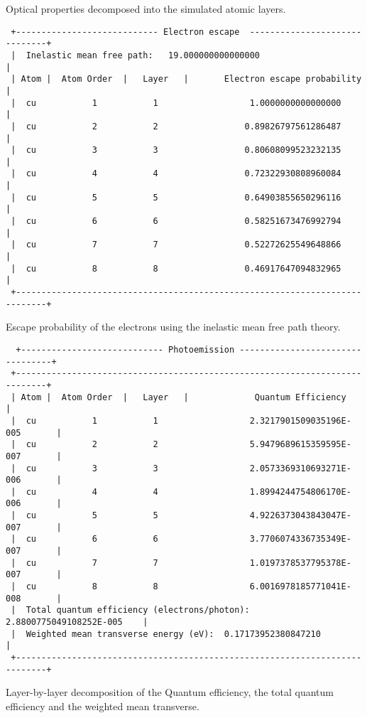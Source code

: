 \documentclass[a4paper,11pt,twoside]{book}
\begin{document}
\begin{enumerate}
Optical properties decomposed into the simulated atomic layers.

\begin{verbatim}
 +---------------------------- Electron escape  ------------------------------+
 |  Inelastic mean free path:   19.000000000000000                            |
 | Atom |  Atom Order  |   Layer   |       Electron escape probability        |
 |  cu           1           1                  1.0000000000000000            |
 |  cu           2           2                 0.89826797561286487            |
 |  cu           3           3                 0.80608099523232135            |
 |  cu           4           4                 0.72322930808960084            |
 |  cu           5           5                 0.64903855650296116            |
 |  cu           6           6                 0.58251673476992794            |
 |  cu           7           7                 0.52272625549648866            |
 |  cu           8           8                 0.46917647094832965            |
 +----------------------------------------------------------------------------+
\end{verbatim}

Escape probability of the electrons using the inelastic mean free path theory.

\begin{verbatim}
  +---------------------------- Photoemission ---------------------------------+
 +----------------------------------------------------------------------------+
 | Atom |  Atom Order  |   Layer   |             Quantum Efficiency           |
 |  cu           1           1                  2.3217901509035196E-005       |
 |  cu           2           2                  5.9479689615359595E-007       |
 |  cu           3           3                  2.0573369310693271E-006       |
 |  cu           4           4                  1.8994244754806170E-006       |
 |  cu           5           5                  4.9226373043843047E-007       |
 |  cu           6           6                  3.7706074336735349E-007       |
 |  cu           7           7                  1.0197378537795378E-007       |
 |  cu           8           8                  6.0016978185771041E-008       |
 |  Total quantum efficiency (electrons/photon):   2.8800775049108252E-005    |
 |  Weighted mean transverse energy (eV):  0.17173952380847210                |
 +----------------------------------------------------------------------------+
\end{verbatim}

Layer-by-layer decomposition of the Quantum efficiency, the total quantum efficiency and the weighted mean transverse.

\end{enumerate}
\end{document}

